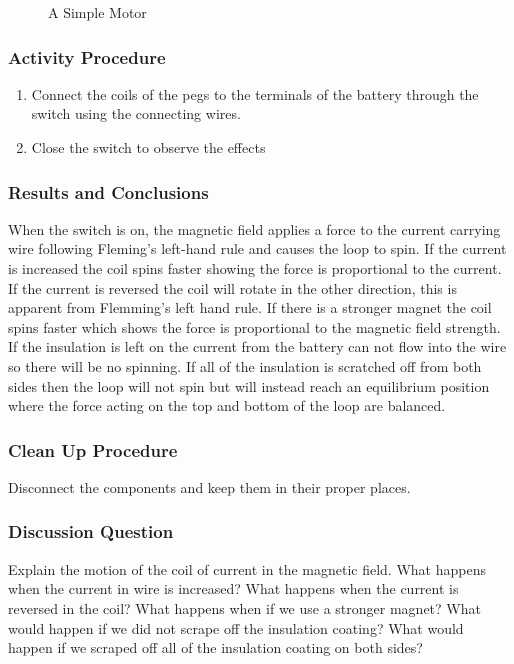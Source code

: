\begin{figure}[h]
\begin{center}
\def\svgwidth{300pt}

\caption{A Simple Motor}
\label{fig:simple-motor}
\end{center}
\end{figure}

\subsubsection*{Activity Procedure}
\begin{enumerate}
\item{Connect the coils of the pegs to the terminals of the battery through the switch using the connecting wires.} 
\item{Close the switch to observe the effects}
\end{enumerate}

\subsubsection*{Results and Conclusions}
When the switch is on, the magnetic field applies a force to the current carrying wire following Fleming's left-hand rule and causes the loop to spin. If the current is increased the coil spins faster showing the force is proportional to the current. If the current is reversed the coil will rotate in the other direction, this is apparent from Flemming's left hand rule. If there is a stronger magnet the coil spins faster which shows the force is proportional to the magnetic field strength. If the insulation is left on the current from the battery can not flow into the wire so there will be no spinning. If all of the insulation is scratched off from both sides then the loop will not spin but will instead reach an equilibrium position where the force acting on the top and bottom of the loop are balanced.  

\subsubsection*{Clean Up Procedure}
Disconnect the components and keep them in their proper places.

\subsubsection*{Discussion Question}
Explain the motion of the coil of current in the magnetic field. What happens when the current in wire is increased? What happens when the current is reversed in the coil? What happens when if we use a stronger magnet? What would happen if we did not scrape off the insulation coating? What would happen if we scraped off all of the insulation coating on both sides?

